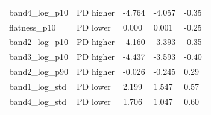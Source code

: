 \documentclass[11pt,a4paper]{article}
\begin{document}
\begin{center}
\begin{longtable}{>{\raggedright\arraybackslash}p{4.20cm}>{\raggedright\arraybackslash}p{2.55cm}>{\raggedleft\arraybackslash}p{2.55cm}>{\raggedleft\arraybackslash}p{2.55cm}>{\raggedleft\arraybackslash}p{2.55cm}}
\hspace{0pt}band4\_\allowbreak{}log\_\allowbreak{}p10 & \hspace{0pt}PD higher & \hspace{0pt}-4.764 & \hspace{0pt}-4.057 & \hspace{0pt}-0.35\\
\hspace{0pt}flatness\_\allowbreak{}p10 & \hspace{0pt}PD lower & \hspace{0pt}0.000 & \hspace{0pt}0.001 & \hspace{0pt}-0.25\\
\hspace{0pt}band2\_\allowbreak{}log\_\allowbreak{}p10 & \hspace{0pt}PD higher & \hspace{0pt}-4.160 & \hspace{0pt}-3.393 & \hspace{0pt}-0.35\\
\hspace{0pt}band3\_\allowbreak{}log\_\allowbreak{}p10 & \hspace{0pt}PD higher & \hspace{0pt}-4.437 & \hspace{0pt}-3.593 & \hspace{0pt}-0.40\\
\hspace{0pt}band2\_\allowbreak{}log\_\allowbreak{}p90 & \hspace{0pt}PD higher & \hspace{0pt}-0.026 & \hspace{0pt}-0.245 & \hspace{0pt}0.29\\
\hspace{0pt}band1\_\allowbreak{}log\_\allowbreak{}std & \hspace{0pt}PD lower & \hspace{0pt}2.199 & \hspace{0pt}1.547 & \hspace{0pt}0.57\\
\hspace{0pt}band4\_\allowbreak{}log\_\allowbreak{}std & \hspace{0pt}PD lower & \hspace{0pt}1.706 & \hspace{0pt}1.047 & \hspace{0pt}0.60\\

\end{longtable}
\end{center}
\end{document}
